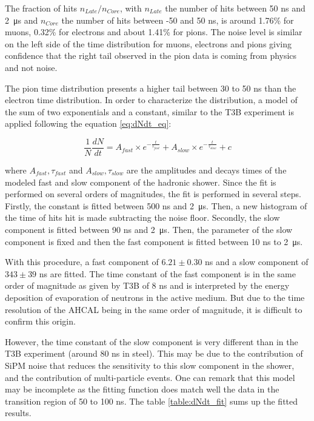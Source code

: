 The fraction of hits $n_{Late}/n_{Core}$, with $n_{Late}$ the number of hits between 50 ns and \SI{2}{\micro\second} and $n_{Core}$ the number of hits between -50 and 50 ns, is around 1.76\% for muons, 0.32\% for electrons and about 1.41\% for pions. The noise level is similar on the left side of the time distribution for muons, electrons and pions giving confidence that the right tail observed in the pion data is coming from physics and not noise.

The pion time distribution presents a higher tail between 30 to 50 ns than the electron time distribution. In order to characterize the distribution, a model of the sum of two exponentials and a constant, similar to the T3B experiment \cite{Simon2013} is applied following the equation \ref{eq:dNdt_eq}:

\begin{equation} \label{eq:dNdt_eq}
	\frac{1}{N}\frac{dN}{dt} = A_{fast} \times e^{-\frac{t}{\tau_{fast}}} + A_{slow} \times e^{-\frac{t}{\tau_{slow}}} + c
\end{equation}

where $A_{fast}, \tau_{fast}$ and $A_{slow}, \tau_{slow}$ are the amplitudes and decays times of the modeled fast and slow component of the hadronic shower. Since the fit is performed on several orders of magnitudes, the fit is performed in several steps. Firstly, the constant is fitted between 500 ns and \SI{2}{\micro\second}. Then, a new histogram of the time of hits hit is made subtracting the noise floor. Secondly, the slow component is fitted between 90 ns and \SI{2}{\micro\second}. Then, the parameter of the slow component is fixed and then the fast component is fitted between 10 ns to \SI{2}{\micro\second}.

With this procedure, a fast component of $6.21 \pm 0.30$ ns and a slow component of $343 \pm 39$ ns are fitted. The time constant of the fast component is in the same order of magnitude as given by T3B of 8 ns and is interpreted by the energy deposition of evaporation of neutrons in the active medium. But due to the time resolution of the AHCAL being in the same order of magnitude, it is difficult to confirm this origin.

However, the time constant of the slow component is very different than in the T3B experiment (around 80 ns in steel). This may be due to the contribution of SiPM noise that reduces the sensitivity to this slow component in the shower, and the contribution of multi-particle events. One can remark that this model may be incomplete as the fitting function does match well the data in the transition region of 50 to 100 ns. The table \ref{table:dNdt_fit} sums up the fitted results.

